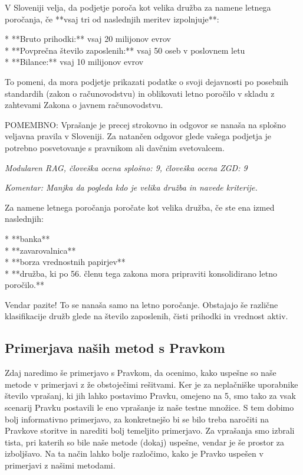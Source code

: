 \documentclass[a4paper,12pt,openright]{book}
\begin{document}
\begin{mdframed}[linewidth=1pt]
	\raggedright
	\ttfamily
	V Sloveniji velja, da podjetje poroča kot velika družba za namene letnega poročanja, če **vsaj tri od naslednjih meritev izpolnjuje**:

	* **Bruto prihodki:** vsaj 20 milijonov evrov \\
	* **Povprečna število zaposlenih:** vsaj 50 oseb v poslovnem letu \\
	* **Bilance:** vsaj 10 milijonov evrov

	To pomeni, da mora podjetje prikazati podatke o svoji dejavnosti po posebnih standardih (zakon o računovodstvu) in oblikovati letno poročilo v skladu z zahtevami Zakona o javnem računovodstvu.


	POMEMBNO: Vprašanje je precej strokovno in odgovor se nanaša na splošno veljavna pravila v Sloveniji. Za natančen odgovor glede vašega podjetja je potrebno posvetovanje s pravnikom ali davčnim svetovalcem.
\end{mdframed}

\textit{Modularen RAG, človeška ocena splošno: 9, človeška ocena ZGD: 9}

\textit{Komentar: Manjka da pogleda kdo je velika družba in navede kriterije.}

\begin{mdframed}[linewidth=1pt]
	\raggedright
	\ttfamily
	Za namene letnega poročanja poročate kot velika družba, če ste ena izmed naslednjih:

	* **banka** \\
	* **zavarovalnica** \\
	* **borza vrednostnih papirjev** \\
	* **družba, ki po 56. členu tega zakona mora pripraviti konsolidirano letno poročilo.**

	Vendar pazite! To se nanaša samo na letno poročanje. Obstajajo še različne klasifikacije družb glede na število zaposlenih, čisti prihodki in vrednost aktiv.
\end{mdframed}

\subsection{Primerjava naših metod s Pravkom}

Zdaj naredimo še primerjavo s Pravkom, da ocenimo, kako uspešne so naše metode v primerjavi z že obstoječimi rešitvami. Ker je za neplačniške uporabnike število vprašanj, ki jih lahko postavimo Pravku, omejeno na 5, smo tako za vsak scenarij Pravku postavili le eno vprašanje iz naše testne množice. S tem dobimo bolj informativno primerjavo, za konkretnejšo bi se bilo treba naročiti na Pravkove storitve in narediti bolj temeljito primerjavo. Za vprašanja smo izbrali tista, pri katerih so bile naše metode (dokaj) uspešne, vendar je še prostor za izboljšavo. Na ta način lahko bolje razločimo, kako je Pravko uspešen v primerjavi z našimi metodami.
\end{document}
